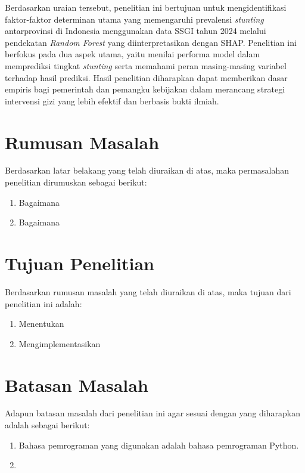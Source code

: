 Berdasarkan uraian tersebut, penelitian ini bertujuan untuk mengidentifikasi faktor-faktor determinan utama yang memengaruhi prevalensi \textit{stunting} antarprovinsi di Indonesia menggunakan data SSGI tahun 2024 melalui pendekatan \textit{Random Forest} yang diinterpretasikan dengan SHAP. Penelitian ini berfokus pada dua aspek utama, yaitu menilai performa model dalam memprediksi tingkat \textit{stunting} serta memahami peran masing-masing variabel terhadap hasil prediksi. Hasil penelitian diharapkan dapat memberikan dasar empiris bagi pemerintah dan pemangku kebijakan dalam merancang strategi intervensi gizi yang lebih efektif dan berbasis bukti ilmiah.

\section{Rumusan Masalah} \label{I.Rumusan Masalah}

Berdasarkan latar belakang yang telah diuraikan di atas, maka permasalahan penelitian dirumuskan sebagai berikut: \par

\begin{enumerate}[noitemsep]
	\item Bagaimana
	\item Bagaimana 
\end{enumerate}


\section{Tujuan Penelitian} \label{I.Tujuan}
Berdasarkan rumusan masalah yang telah diuraikan di atas, maka tujuan dari penelitian ini adalah: \par

\begin{enumerate}[noitemsep]
	\item Menentukan 
	\item Mengimplementasikan
\end{enumerate}


\section{Batasan Masalah} \label{I.Batasan}
Adapun batasan masalah dari penelitian ini agar sesuai dengan yang diharapkan adalah sebagai berikut: \par

\begin{enumerate}[noitemsep]
    \item Bahasa pemrograman yang digunakan adalah bahasa pemrograman Python.
    \item 
\end{enumerate}


